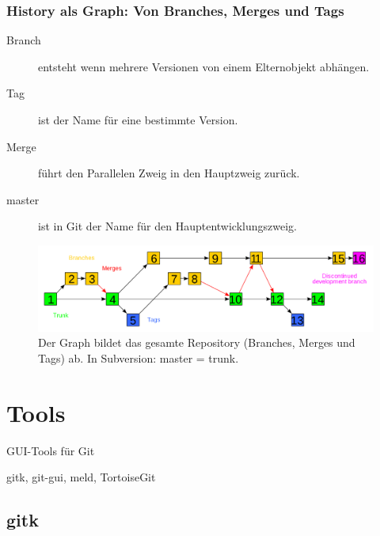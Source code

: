 \documentclass{beamer}
\begin{document}
\begin{frame}\frametitle{History als Graph: Von Branches, Merges und Tags}
\begin{description}
\item[Branch] entsteht wenn mehrere Versionen von einem Elternobjekt abhängen.
\item[Tag] ist der Name für eine bestimmte Version. 
\item[Merge] führt den Parallelen Zweig in den Hauptzweig zurück.
\item[master] ist in Git der Name für den Hauptentwicklungszweig.
\end{description}

\begin{figure}
\includegraphics[scale=0.15]{2000px-Subversion_project_visualization} 
{\tiny \caption{Der Graph bildet das gesamte Repository (Branches, Merges und Tags) ab. In Subversion: master = trunk.}}
\end{figure}
\end{frame}

\section{Tools}
\begin{frame}[c]
\begin{center}
\begin{Huge}
GUI-Tools für Git
\end{Huge}

gitk, git-gui, meld, TortoiseGit
\end{center}
\end{frame}


\subsection{gitk}
\end{document}

